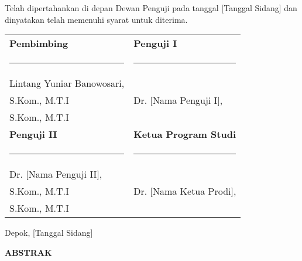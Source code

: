 \documentclass[12pt,a4paper,oneside]{report}
\begin{document}
\vspace{1cm}

\noindent
Telah dipertahankan di depan Dewan Penguji pada tanggal [Tanggal Sidang] dan dinyatakan telah memenuhi syarat untuk diterima.

\vspace{1.5cm}

\begin{center}
\begin{tabular}{p{7.5cm}p{7.5cm}}
\textbf{Pembimbing} & \textbf{Penguji I} \\[4cm]
\rule{6.5cm}{0.5pt} & \rule{6.5cm}{0.5pt}\\
Lintang Yuniar Banowosari,\\S.Kom., M.T.I & Dr. [Nama Penguji I],\\S.Kom., M.T.I\\[2.5cm]

\textbf{Penguji II} & \textbf{Ketua Program Studi}\\[4cm]
\rule{6.5cm}{0.5pt} & \rule{6.5cm}{0.5pt}\\
Dr. [Nama Penguji II],\\S.Kom., M.T.I & Dr. [Nama Ketua Prodi],\\S.Kom., M.T.I\\
\end{tabular}
\end{center}

\vspace{1cm}

\begin{center}
Depok, [Tanggal Sidang]
\end{center}

\newpage
{}
\begin{center}
{\Large\bfseries ABSTRAK}
\end{center}
\end{document}
